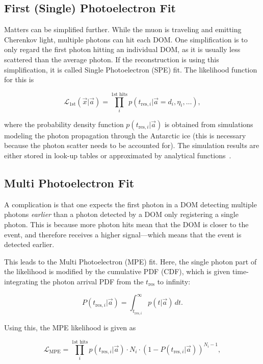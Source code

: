 \subsection{First (Single) Photoelectron Fit}
Matters can be simplified further. While the muon is traveling and emitting Cherenkov light, multiple photons can hit each DOM\@. One simplification is to only regard the first photon hitting an individual DOM, as it is usually less scattered than the average photon. If the reconstruction is using this simplification, it is called Single Photoelectron (SPE) fit. The likelihood function for this is

\begin{equation}
    \mathcal{L}_\text{1st}(\vec{x}|\vec{a}) = \prod_i^\text{1st hits} p(t_{\text{res},i}|\vec{a}=d_i, \eta_i,\ldots),
\end{equation}

where the probability density function $p(t_{\text{res},i}|\vec{a})$ is obtained from simulations modeling the photon propagation through the Antarctic ice (this is necessary because the photon scatter needs to be accounted for). The simulation results are either stored in look-up tables or approximated by analytical functions~\cite{Ahrens2004}.

\subsection{Multi Photoelectron Fit}
A complication is that one expects the first photon in a DOM detecting multiple photons \textit{earlier} than a photon detected by a DOM only registering a single photon. This is because more photon hits mean that the DOM is closer to the event, and therefore receives a higher signal---which means that the event is detected earlier.

This leads to the Multi Photoelectron (MPE) fit. Here, the single photon part of the likelihood is modified by the cumulative PDF (CDF), which is given time-integrating the photon arrival PDF from the $t_\text{res}$ to infinity:

\begin{equation}
    P(t_{\text{res},i}|\vec{a}) = \int^{\infty}_{t_{\text{res},i}}p(t|\vec{a})\,dt.
\end{equation}

Using this, the MPE likelihood is given as

\begin{equation}
    \mathcal{L}_\text{MPE} = \prod_i^\text{1st hits} p(t_{\text{res},i}|\vec{a}) \cdot N_i \cdot (1-P(t_{\text{res},i}|\vec{a}))^{N_i-1},
\end{equation}

